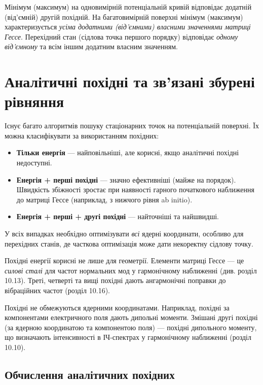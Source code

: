 \documentclass{PySCFBook}
\begin{document}
Мінімум (максимум) на одновимірній потенціальній кривій відповідає додатній (від’ємній) другій похідній. На багатовимірній поверхні мінімум (максимум) характеризується \emph{усіма додатними (від’ємними) власними значеннями матриці Гессе}. Перехідний стан (сідлова точка першого порядку) відповідає \emph{одному від’ємному} та всім іншим додатним власним значенням.

\section{Аналітичні похідні та зв’язані збурені рівняння}

Існує багато алгоритмів пошуку стаціонарних точок на потенціальній поверхні. Їх можна класифікувати за використанням похідних:

\begin{itemize}
  \item \textbf{Тільки енергія} --- найповільніші, але корисні, якщо аналітичні похідні недоступні.
  \item \textbf{Енергія + перші похідні} --- значно ефективніші (майже на порядок). Швидкість збіжності зростає при наявності гарного початкового наближення до матриці Гессе (наприклад, з нижчого рівня ab initio).
  \item \textbf{Енергія + перші + другі похідні} --- найточніші та найшвидші.
\end{itemize}

У всіх випадках необхідно оптимізувати \emph{всі} ядерні координати, особливо для перехідних станів, де часткова оптимізація може дати некоректну сідлову точку.

Похідні енергії корисні не лише для геометрії. Елементи матриці Гессе --- це \emph{силові сталі} для частот нормальних мод у гармонічному наближенні (див. розділ 10.13). Треті, четверті та вищі похідні дають ангармонічні поправки до вібраційних частот (розділ 10.16).

Похідні не обмежуються ядерними координатами. Наприклад, похідні за компонентами електричного поля дають дипольні моменти. Змішані другі похідні (за ядерною координатою та компонентою поля) --- похідні дипольного моменту, що визначають інтенсивності в ІЧ-спектрах у гармонічному наближенні (розділ 10.10).

\subsection{Обчислення аналітичних похідних}
\end{document}
